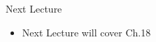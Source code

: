 \documentclass[aspectratio=1610]{beamer}
\begin{document}

%			
%			

\begin{frame}[wide]{Next Lecture}
	\begin{itemize}
		\item Next Lecture will cover Ch.18
	\end{itemize}
\end{frame}
\end{document}
